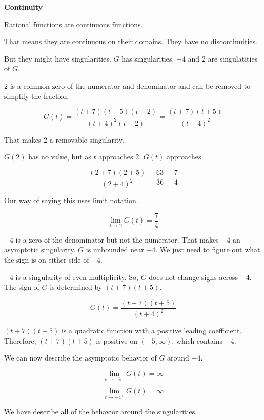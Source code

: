 \documentclass{ximera}
\begin{document}
\textbf{\textcolor{purple!85!blue}{Continuity}} 

\begin{explanation}

Rational functions are continuous functions.

That means they are continuous on their domains. They have no discontinuities.

But they might have singularities.  $G$ has singularities. $-4$ and $2$ are singulatities of $G$.


$2$ is a common zero of the numerator and denominator and can be removed to simplify the fraction


\[
G(t) = \frac{(t+7)(t+5)(t-2)}{(t+4)^2(t-2)} = \frac{(t+7)(t+5)}{(t+4)^2}
\]

That makes $2$ a removable singularity.


$G(2)$ has no value, but as $t$ approaches $2$, $G(t)$ approaches 


\[
\frac{(2+7)(2+5)}{(2+4)^2} = \frac{63}{36} = \frac{7}{4}
\]



Our way of saying this uses limit notation.



\[
\lim\limits_{t \to 2} G(t) = \frac{7}{4}
\]




$-4$ is a zero of the denominator but not the numerator.  That makes $-4$ an asymptotic singularity.  $G$ is unbounded near $-4$.  We just need to figure out what the sign is on either side of $-4$.


$-4$ is a singularity of even multiplicity.  So, $G$ does not change signs across $-4$.  The sign of $G$ is determined by $(t+7)(t+5)$.

\[
G(t) = \frac{(t+7)(t+5)}{(t+4)^2}
\]


$(t+7)(t+5)$ is a quadratic function with a positive leading coefficient. Therefore, $(t+7)(t+5)$ is positive on $(-5, \infty)$, which contains $-4$.

We can now describe the asymptotic behavior of $G$ around $-4$.


\[
\lim\limits_{t \to -4^-} G(t) = \infty
\]


\[
\lim\limits_{t \to -4^+} G(t) = \infty
\]

\end{explanation}



We have describe all of the behavior around the singularities. 
\end{document}
